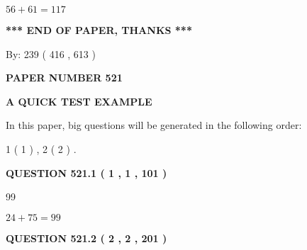 \documentclass[12pt]{article}
\begin{document}
$ %
56 +  %
61=   %
117$
 
 
   
   
 \vspace{0.2in}
 
   
   
   
   
\vspace{1.0in} 
{\textbf{\large{ *** END OF PAPER, THANKS *** }}} 
   
   
\hspace{1.0in} By: 
 239 ( 416 ,  613 )
   
   
   
   
\newpage 
\setcounter{page}{ 
   521001 } 
   
   
   
   
 {\textbf{ \Large{ PAPER NUMBER  521  }}}
   
   
\vspace{0.2in}
   
   
   
   
   
   
 \vspace{0.2in}
{\LARGE {\textbf{ A QUICK TEST EXAMPLE}}}
   
   
   
\vspace{0.2in}
   
In this paper, big questions will be generated in the following order: 
   
   
   1 ( 1 )
 ,
   2 ( 2 )
 .
  
\vspace{0.2in}
  
{\textbf{\Large{QUESTION
521.1 
 ( 1 , 1 , 101 )
}}}
  
  
 
 
\noindent{}

99
 
 
 
 
\noindent{}

$ %
24 +  %
75=   %
99$
 
 
  
\vspace{0.2in}
  
{\textbf{\Large{QUESTION
521.2 
 ( 2 , 2 , 201 )
}}}
  
\end{document}
